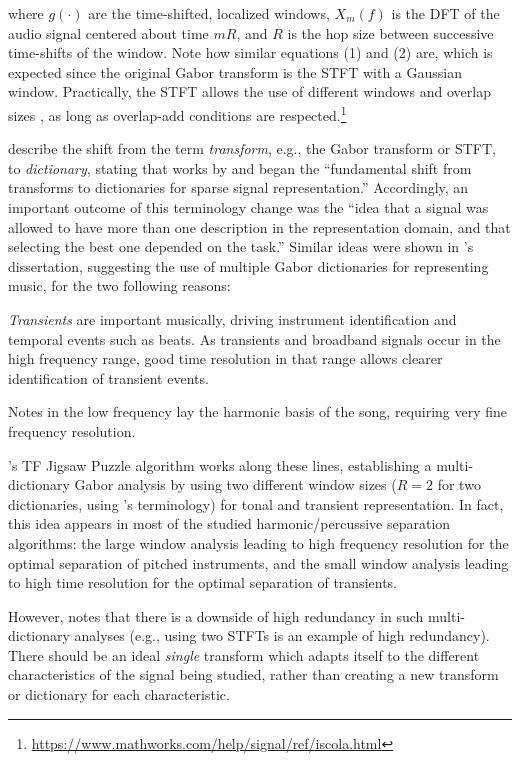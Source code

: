 \documentclass[letter,12pt]{article}
\newenvironment{tight_itemize}{
\begin{itemize}
  \setlength{\itemsep}{0pt}
  \setlength{\parskip}{0pt}
}{\end{itemize}}
\begin{document}
where $g(\cdot)$ are the time-shifted, localized windows, $X_{m}(f)$ is the DFT of the audio signal centered about time $mR$, and $R$ is the hop size between successive time-shifts of the window. Note how similar equations (1) and (2) are, which is expected since the original Gabor transform is the STFT with a Gaussian window. Practically, the STFT allows the use of different windows and overlap sizes \cite{stftinvertible}, as long as overlap-add conditions are respected.\footnote{\url{https://www.mathworks.com/help/signal/ref/iscola.html}}

\citet{dictionary} describe the shift from the term \textit{transform}, e.g., the Gabor transform or STFT, to \textit{dictionary}, stating that works by \cite{dictionary1} and \cite{dictionary2} began the ``fundamental shift from transforms to dictionaries for sparse signal representation.'' Accordingly, an important outcome of this terminology change was the ``idea that a signal was allowed to have more than one description in the representation domain, and that selecting the best one depended on the task.'' Similar ideas were shown in \citet{doerflerphd}'s dissertation, suggesting the use of multiple Gabor dictionaries for representing music, for the two following reasons:

\begin{tight_itemize}
	\item
		\textit{Transients} are important musically, driving instrument identification and temporal events such as beats. As transients and broadband signals occur in the high frequency range, good time resolution in that range allows clearer identification of transient events.
	\item
		 Notes in the low frequency lay the harmonic basis of the song, requiring very fine frequency resolution.
\end{tight_itemize}

\citet{tfjigsaw}'s TF Jigsaw Puzzle algorithm works along these lines, establishing a multi-dictionary Gabor analysis by using two different window sizes ($R = 2$ for two dictionaries, using \citet{doerflerphd}'s terminology) for tonal and transient representation. In fact, this idea appears in most of the studied harmonic/percussive separation algorithms: the large window analysis leading to high frequency resolution for the optimal separation of pitched instruments, and the small window analysis leading to high time resolution for the optimal separation of transients.

However, \citet{doerflerphd} notes that there is a downside of high redundancy in such multi-dictionary analyses (e.g., using two STFTs is an example of high redundancy). There should be an ideal \textit{single} transform which adapts itself to the different characteristics of the signal being studied, rather than creating a new transform or dictionary for each characteristic.
\end{document}
